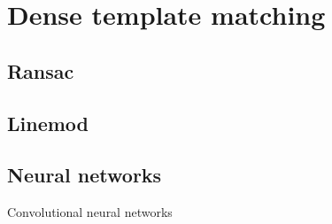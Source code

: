 \chapter{Dense template matching}
\label{cha:template}

\section{Ransac}
\label{seq:ransac}


\section{Linemod}
\label{seq:linemod}


\section{Neural networks}
\label{seq:neural}

Convolutional neural networks